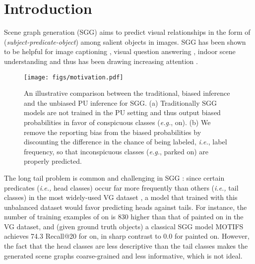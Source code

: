 \documentclass[sigconf]{acmart}
\begin{document}
\maketitle
\pagestyle{plain}


\section{Introduction}
Scene graph generation (SGG) \cite{lu2016visual} aims to predict visual relationships in the form of (\textit{subject-predicate-object}) among salient objects in images.
SGG has been shown to be helpful for image captioning \cite{yao2018exploring,yang2019auto,li2019know}, visual question answering \cite{teney2017graph,shi2019explainable}, indoor scene understanding \cite{armeni20193d, chiou2020zero} and thus has been drawing increasing attention \cite{zellers2018neural,yang2018graph,herzig2018mapping,chen2019knowledge,chen2019scene,gu2019scene,chen2019soft,dornadula2019visual,zareian2020bridging,Khademi_Schulte_2020,tang2020unbiased,Lin_2020_CVPR,DBLP:conf/bmvc/WangPL20,yan2020pcpl,knyazev2020graphdensity,he2020learning,wang2020sketching,zareian2020learning,sharifzadeh2020classification,10.1145/3394171.3413566,9084259,10.1145/3394171.3413575,hung2020contextual,tian2020part,DBLP:journals/corr/abs-2001-04735,chiou2021visual,chiou2021st}.

\begin{figure}[t!]
\begin{center}
\texttt{[image: figs/motivation.pdf]}
\end{center}
\vspace{-1.5em}
  \caption{
  An illustrative comparison between the traditional, biased inference and the unbiased PU inference for SGG.
  (a) Traditionally SGG models are not trained in the PU setting and thus output biased probabilities in favor of conspicuous classes (\emph{e.g.}, {\selectfont on}).
  (b) We remove the reporting bias from the biased probabilities by discounting the difference in the chance of being labeled, \emph{i.e.}, label frequency, so that inconspicuous classes (\emph{e.g.}, {\selectfont parked on}) are properly predicted.
  }
\label{fig:motivation}
\vspace{-1.5em}
\end{figure}

The long tail problem is common and challenging in SGG \cite{tang2020unbiased}: since certain predicates (\emph{i.e.,} head classes) occur far more frequently than others (\emph{i.e.,} tail classes) in the most widely-used VG dataset \cite{krishna2017visual}, a model that trained with this unbalanced dataset would favor predicting heads against tails.
For instance, the number of training examples of {\selectfont on} is 830 higher than that of {\selectfont painted on} in the VG dataset, and (given ground truth objects) a classical SGG model MOTIFS \cite{zellers2018neural} achieves 74.3 Recall@20 for {\selectfont on}, in sharp contrast to 0.0 for {\selectfont painted on}.
However, the fact that the head classes are less descriptive than the tail classes makes the generated scene graphs coarse-grained and less informative, which is not ideal.
\end{document}
